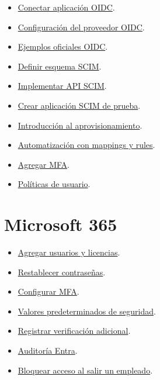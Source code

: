 \documentclass[12pt,a4paper]{article}
\begin{document}
\begin{itemize}
\item \href{https://developers.onelogin.com/docs/openid-connect/connect-to-onelogin/}{Conectar aplicación OIDC}.
\item \href{https://developers.onelogin.com/docs/openid-connect/api/provider-config/}{Configuración del proveedor OIDC}.
\item \href{https://developers.onelogin.com/docs/openid-connect/samples/}{Ejemplos oficiales OIDC}.
\item \href{https://developers.onelogin.com/docs/scim/define-user-schema/}{Definir esquema SCIM}.
\item \href{https://developers.onelogin.com/docs/scim/implement-scim-api/}{Implementar API SCIM}.
\item \href{https://developers.onelogin.com/docs/scim/create-app/}{Crear aplicación SCIM de prueba}.
\item \href{https://onelogin.service-now.com/kb?id=kb_article_view&sysparm_article=KB0010298}{Introducción al aprovisionamiento}.
\item \href{https://onelogin.service-now.com/kb?id=kb_article_view&sysparm_article=KB0011995}{Automatización con mappings y rules}.
\item \href{https://www.onelogin.com/getting-started/free-trial-plan/add-mfa}{Agregar MFA}.
\item \href{https://support.onelogin.com/kb/4271392/user-policies}{Políticas de usuario}.
\end{itemize}
\section*{Microsoft 365}
\begin{itemize}
\item \href{https://learn.microsoft.com/en-us/microsoft-365/admin/add-users/add-users?view=o365-worldwide}{Agregar usuarios y licencias}.
\item \href{https://learn.microsoft.com/en-gb/microsoft-365/admin/add-users/reset-passwords?view=o365-worldwide}{Restablecer contraseñas}.
\item \href{https://learn.microsoft.com/en-us/microsoft-365/admin/security-and-compliance/set-up-multi-factor-authentication}{Configurar MFA}.
\item \href{https://learn.microsoft.com/en-us/entra/fundamentals/security-defaults}{Valores predeterminados de seguridad}.
\item \href{https://support.microsoft.com/en-us/office/account-management/set-up-your-microsoft-365-sign-in-for-multi-factor-authentication}{Registrar verificación adicional}.
\item \href{https://learn.microsoft.com/en-us/entra/identity/monitoring-health/concept-audit-logs}{Auditoría Entra}.
\item \href{https://learn.microsoft.com/en-us/microsoft-365/admin/add-users/remove-former-employee-step-1?view=o365-worldwide}{Bloquear acceso al salir un empleado}.
\end{itemize}
\end{document}
